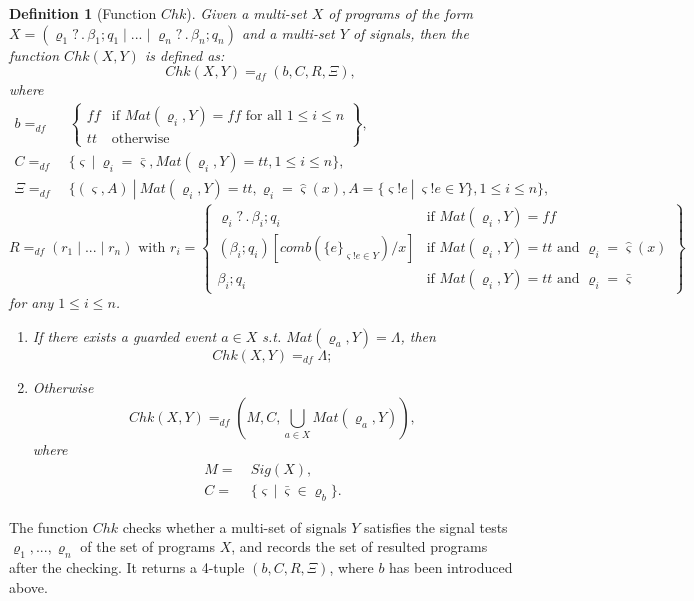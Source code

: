 \documentclass{fcs}
\newtheorem{mydef}{Definition}[section]
\newcommand{\sig}[0]{\varsigma}
\newcommand{\true}[0]{\mathit{tt}}
\newcommand{\false}[0]{\mathit{ff}}
\DeclareMathOperator{\seq}{;}
\newcommand{\none}[0]{\Lambda}
\newcommand{\Chk}[0]{\mathit{Chk}}
\newcommand{\Match}[0]{\mathit{Mat}}
\newcommand{\Signal}[0]{\mathit{Sig}}
\DeclareMathOperator{\sep}{|}
\DeclareMathOperator{\nex}{.}
\newcommand{\comb}[0]{\mathit{comb}}
\newcommand{\SV}[0]{\Xi}
\newcommand{\dddef}[0]{=_{df}}
\begin{document}
\begin{mydef}[Function $\Chk$]
	\label{def:Function Chk}
	Given a multi-set $X$ of programs of the form $X = (\varrho_1?\nex \beta_1\seq q_1\sep ...\sep \varrho_n?\nex \beta_n\seq q_n)$ and a multi-set $Y$ of signals,
    then the function $\Chk(X, Y)$ is defined as:
	$$\Chk(X, Y)\dddef (b, C, R, \SV), $$
	where
    $$
    \begin{aligned}
    b\dddef&\  \left\{
        \begin{array}{ll}
            \false & \mbox{if $\Match(\varrho_i, Y)=\false$ for all $1\le i\le n$}\\
            \true & \mbox{otherwise}
        \end{array}
    \right\},
    \\
	C\dddef&\ \{\sig\ |\ \varrho_i = \bar{\sig}, \Match(\varrho_i, Y) = \true, 1\le i\le n\},
	\\
    \SV \dddef&\ \{(\sig, A)\ |\ \Match(\varrho_i, Y)=\true, \varrho_i = \hat{\sig}(x), A = \{\sig!e\ |\ \sig!e\in Y\}, 1\le i\le n\},
    \end{aligned}
    $$
	$$
	R\dddef (r_1\sep...\sep r_n)\mbox{ with }r_i = \left\{\begin{array}{ll}
	    \varrho_i?\nex \beta_i\seq q_i &\mbox{if $\Match(\varrho_i, Y) = \false$}\\
	    (\beta_i\seq q_i)[\comb(\{e\}_{\sig!e\in Y})/x] &\mbox{if $\Match(\varrho_i, Y)=\true$ and $\varrho_i = \hat{\sig}(x)$}\\
	    \beta_i\seq q_i &\mbox{if $\Match(\varrho_i, Y)=\true$ and $\varrho_i = \bar{\sig}$}
	\end{array}\right\}
	$$
	for any $1\le i\le n$.
	\ifx
	\begin{enumerate}
		\item If there exists a guarded event $a\in X$ s.t. $\Match(\varrho_a, Y) = \none$, then
		$$\Chk(X, Y) \dddef \none;$$
		\item Otherwise %
		 $$\Chk(X, Y)\dddef (M, C, \bigcup_{a\in X}\Match(\varrho_a, Y)), $$
		 where
		 $$\begin{aligned}
		 M =&\ \Signal(X),\\
		 C =&\ \{\sig\ |\ \bar{\sig}\in \varrho_b\}.
		 \end{aligned}		
		 $$
		 \end{enumerate}
    \fi
		
\end{mydef}

The function $\Chk$ checks whether a multi-set of signals $Y$ satisfies the signal tests $\varrho_1,...,\varrho_n$ of the set of programs $X$,
and records the set of  resulted programs after the checking.
It returns a 4-tuple $(b, C, R, \SV)$, where $b$ has been introduced above.
\end{document}

